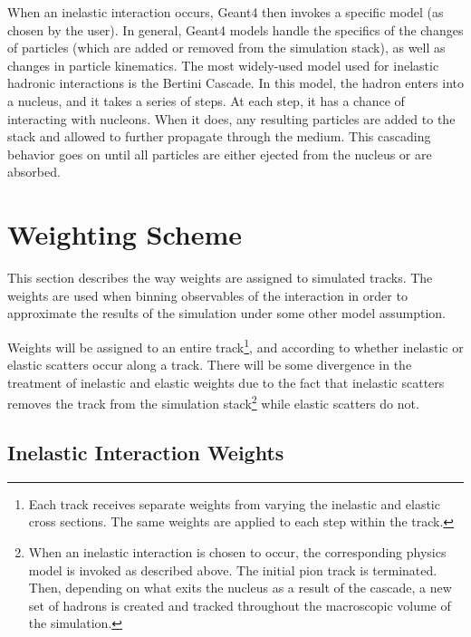 \documentclass[12pt]{article}
\begin{document}
When an inelastic interaction occurs, Geant4 then invokes a specific model (as chosen by the user). In general, Geant4 models handle the specifics of the changes of particles (which are added or removed from the simulation stack), as well as changes in particle kinematics. The most widely-used model used for inelastic hadronic interactions is the Bertini Cascade. In this model, the hadron enters into a nucleus, and it takes a series of steps. At each step, it has a chance of interacting with nucleons. When it does, any resulting particles are added to the stack and allowed to further propagate through the medium. This cascading behavior goes on until all particles are either ejected from the nucleus or are absorbed. 

\section{Weighting Scheme}
This section describes the way weights are assigned to simulated tracks. The weights are used when binning observables of the interaction in order to approximate the results of the simulation under some other model assumption.

Weights will be assigned to an entire track\footnote{Each track receives separate weights from varying the inelastic and elastic cross sections. The same weights are applied to each step within the track.}, and according to whether inelastic or elastic scatters occur along a track. There will be some divergence in the treatment of inelastic and elastic weights due to the fact that inelastic scatters removes the track from the simulation stack\footnote{When an inelastic interaction is chosen to occur, the corresponding physics model is invoked as described above. The initial pion track is terminated. Then, depending on what exits the nucleus as a result of the cascade, a new set of hadrons is created and tracked throughout the macroscopic volume of the simulation.} while elastic scatters do not. 

\subsection{Inelastic Interaction 
Weights}\label{subsec:inel_weights}
\end{document}
